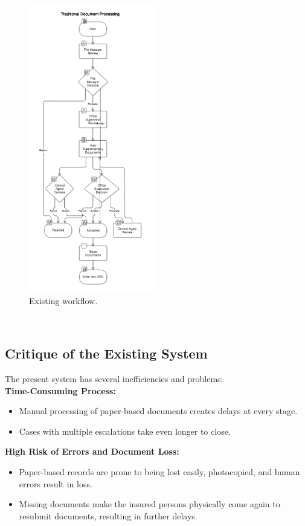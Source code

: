 \begin{figure}[htbp]
    \centering
    \includegraphics[width=0.5\textwidth]{figures/etude de l'existant.png} 
    \caption{Existing workflow.}
\end{figure} \

\subsection{Critique of the Existing System}
The present system has several inefficiencies and problems:\\
\textbf{ Time-Consuming Process:}
\begin{itemize}
    \item Manual processing of paper-based documents creates delays at every stage.
    \item Cases with multiple escalations take even longer to close.
\end{itemize}

\textbf{ High Risk of Errors and Document Loss:}
\begin{itemize}
    \item Paper-based records are prone to being lost easily, photocopied, and human errors result in loss.
    \item Missing documents make the insured persons physically come again to resubmit documents, resulting in further delays.
\end{itemize}

